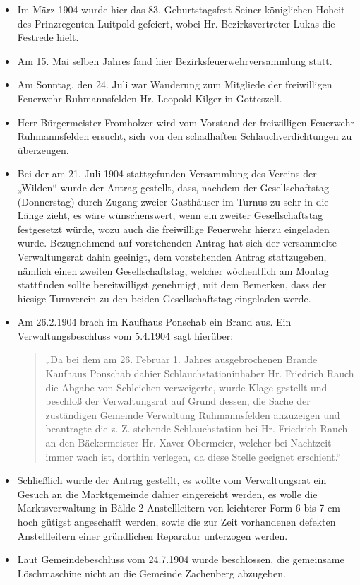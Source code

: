 \documentclass[12pt,a4paper]{book}
\begin{document}
\begin{itemize}
\item Im März 1904 wurde hier das 83. Geburtstagsfest Seiner königlichen
Hoheit des Prinzregenten Luitpold gefeiert, wobei Hr. Bezirksvertreter
Lukas die Festrede hielt.

\item Am 15. Mai selben Jahres fand hier Bezirksfeuerwehrversammlung
statt.

\item Am Sonntag, den 24. Juli war Wanderung zum Mitgliede der
freiwilligen Feuerwehr Ruhmannsfelden Hr. Leopold Kilger in Gotteszell.

\item Herr Bürgermeister Fromholzer wird vom Vorstand der freiwilligen
Feuerwehr Ruhmannsfelden ersucht, sich von den schadhaften
Schlauchverdichtungen zu überzeugen.

\item Bei der am 21. Juli 1904 stattgefunden Versammlung des Vereins der
„Wilden“ wurde der Antrag gestellt, dass, nachdem der Gesellschaftstag
(Donnerstag) durch Zugang zweier Gasthäuser im Turnus zu sehr in die
Länge zieht, es wäre wünschenswert, wenn ein zweiter Gesellschaftstag
festgesetzt würde, wozu auch die freiwillige Feuerwehr hierzu eingeladen
wurde. Bezugnehmend auf vorstehenden Antrag hat sich der versammelte
Verwaltungsrat dahin geeinigt, dem vorstehenden Antrag stattzugeben,
nämlich einen zweiten Gesellschaftstag, welcher wöchentlich am Montag
stattfinden sollte bereitwilligst genehmigt, mit dem Bemerken, dass der
hiesige Turnverein zu den beiden Gesellschaftstag eingeladen werde.

\item Am 26.2.1904 brach im Kaufhaus Ponschab ein Brand aus. Ein
Verwaltungsbeschluss vom 5.4.1904 sagt hierüber:

\begin{quote}
„Da bei dem am 26. Februar 1. Jahres ausgebrochenen Brande Kaufhaus
Ponschab dahier Schlauchstationinhaber Hr. Friedrich Rauch die Abgabe
von Schleichen verweigerte, wurde Klage gestellt und beschloß der
Verwaltungsrat auf Grund dessen, die Sache der zuständigen Gemeinde
Verwaltung Ruhmannsfelden anzuzeigen und beantragte die z. Z. stehende
Schlauchstation bei Hr. Friedrich Rauch an den Bäckermeister Hr. Xaver
Obermeier, welcher bei Nachtzeit immer wach ist, dorthin verlegen, da
diese Stelle geeignet erschient.“
\end{quote}

\item Schließlich wurde der Antrag gestellt, es wollte vom
Verwaltungsrat ein Gesuch an die Marktgemeinde dahier eingereicht
werden, es wolle die Marktsverwaltung in Bälde 2 Anstellleitern von
leichterer Form 6 bis 7 cm hoch gütigst angeschafft werden, sowie die
zur Zeit vorhandenen defekten Anstellleitern einer gründlichen Reparatur
unterzogen werden.

\item Laut Gemeindebeschluss vom 24.7.1904 wurde beschlossen, die
gemeinsame Löschmaschine nicht an die Gemeinde Zachenberg abzugeben.
\end{itemize}
\end{document}
